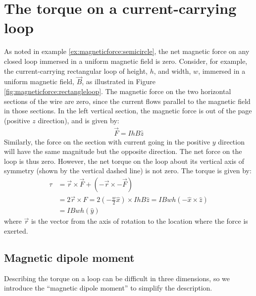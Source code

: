 \section{The torque on a current-carrying loop}
As noted in example \ref{ex:magneticforce:semicircle}, the net magnetic force on any closed loop immersed in a uniform magnetic field is zero. Consider, for example, the current-carrying rectangular loop of height, $h$, and width, $w$, immersed in a uniform magnetic field, $\vec B$, as illustrated in Figure \ref{fig:magneticforce:rectangleloop}.
The magnetic force on the two horizontal sections of the wire are zero, since the current flows parallel to the magnetic field in those sections. In the left vertical section, the magnetic force is out of the page (positive $z$ direction), and is given by:
\begin{align*}
\vec F = IhB\hat z
\end{align*}
Similarly, the force on the section with current going in the positive $y$ direction will have the same magnitude but the opposite direction. The net force on the loop is thus zero. However, the net torque on the loop about its vertical axis of symmetry (shown by the vertical dashed line) is not zero. The torque is given by:
\begin{align*}
\tau &= \vec r\times \vec F + (-\vec r \times - \vec F)\\
&= 2 \vec r \times F = 2 (-\frac{w}{2}\hat x) \times IhB\hat z = IBwh (-\hat x\times \hat z)\\
&=IBwh (\hat y)
\end{align*}
where $\vec r$ is the vector from the axis of rotation to the location where the force is exerted.

\subsection{Magnetic dipole moment}
Describing the torque on a loop can be difficult in three dimensions, so we introduce the ``magnetic dipole moment'' to simplify the description.

